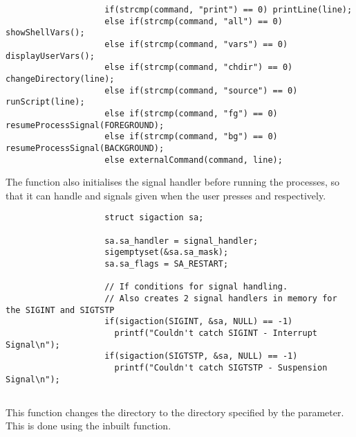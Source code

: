 \documentclass[12pt, a4paper]{report}
\begin{document}
                \begingroup
                \fontsize{10pt}{10pt}\selectfont
                \begin{verbatim}
                    if(strcmp(command, "print") == 0) printLine(line);
                    else if(strcmp(command, "all") == 0) showShellVars();
                    else if(strcmp(command, "vars") == 0) displayUserVars();
                    else if(strcmp(command, "chdir") == 0) changeDirectory(line); 
                    else if(strcmp(command, "source") == 0) runScript(line);
                    else if(strcmp(command, "fg") == 0) resumeProcessSignal(FOREGROUND);
                    else if(strcmp(command, "bg") == 0) resumeProcessSignal(BACKGROUND);
                    else externalCommand(command, line);
                \end{verbatim}
                \endgroup

                \clearpage

                The function also initialises the signal handler before running the
                processes, so that it can handle  and  signals
                given when the user presses  and  respectively.

                \begingroup
                \fontsize{10pt}{10pt}\selectfont
                \begin{verbatim}
                    struct sigaction sa;

                    sa.sa_handler = signal_handler;
                    sigemptyset(&sa.sa_mask);
                    sa.sa_flags = SA_RESTART;
                  
                    // If conditions for signal handling.
                    // Also creates 2 signal handlers in memory for the SIGINT and SIGTSTP
                    if(sigaction(SIGINT, &sa, NULL) == -1)
                      printf("Couldn't catch SIGINT - Interrupt Signal\n");
                    if(sigaction(SIGTSTP, &sa, NULL) == -1)
                      printf("Couldn't catch SIGTSTP - Suspension Signal\n");
                \end{verbatim}
                \endgroup
            
            \subsection{}
                This function changes the directory to the directory specified by
                the parameter. This is done using the inbuilt  function.
\end{document}
